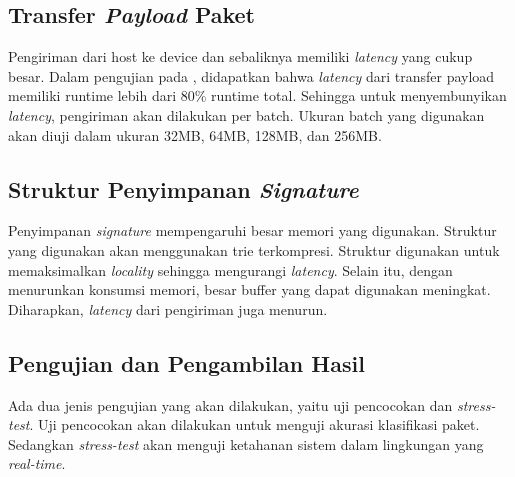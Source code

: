    \subsection{Transfer \emph{Payload} Paket}

      Pengiriman dari host ke device dan sebaliknya memiliki \emph{latency} yang cukup besar. Dalam pengujian pada \textcite{gnort2008}, didapatkan bahwa \emph{latency} dari transfer payload memiliki runtime lebih dari 80\% runtime total. Sehingga untuk menyembunyikan \emph{latency}, pengiriman akan dilakukan per batch. Ukuran batch yang digunakan akan diuji dalam ukuran 32MB, 64MB, 128MB, dan 256MB.

    \subsection{Struktur Penyimpanan \emph{Signature}}

      Penyimpanan \emph{signature} mempengaruhi besar memori yang digunakan. Struktur yang digunakan akan menggunakan trie terkompresi. Struktur digunakan untuk memaksimalkan \emph{locality} sehingga mengurangi \emph{latency}. Selain itu, dengan menurunkan konsumsi memori, besar buffer yang dapat digunakan meningkat. Diharapkan, \emph{latency} dari pengiriman juga menurun.

    \subsection{Pengujian dan Pengambilan Hasil}

      Ada dua jenis pengujian yang akan dilakukan, yaitu uji pencocokan dan \emph{stress-test}. Uji pencocokan akan dilakukan untuk menguji akurasi klasifikasi paket. Sedangkan \emph{stress-test} akan menguji ketahanan sistem dalam lingkungan yang \emph{real-time}.